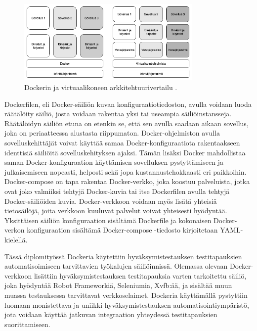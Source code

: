     \begin{figure}[H]
      \centering
      \includegraphics[width=0.8\textwidth]{assets/docker-vs-virtual-machine.png}
      \caption{Dockerin ja virtuaalikoneen arkkitehtuurivertailu \parencite{docker_vs_virtual_machine}.}
      \label{fig:docker-vs-virtual-machine}
    \end{figure}

    Dockerfilen, eli Docker-säiliön kuvan konfiguraatiotiedoston, avulla voidaan luoda räätälöity säiliö, josta voidaan rakentaa yksi tai useampia säiliöinstansseja.
    Räätälöidyn säiliön etuna on etenkin se, että sen avulla saadaan aikaan sovellus, joka on periaatteessa alustasta riippumaton.
    Docker-ohjelmiston avulla sovelluskehittäjät voivat käyttää samaa Docker-konfiguraatiota rakentaakseen identtisiä säiliöitä sovelluskehityksen ajaksi.
    Tämän lisäksi Docker mahdollistaa saman Docker-konfiguraation käyttämisen sovelluksen pystyttämiseen ja julkaisemiseen nopeasti, helposti sekä jopa kustannustehokkaasti eri paikkoihin.
    Docker-compose on tapa rakentaa Docker-verkko, joka koostuu palveluista, jotka ovat joko valmiiksi tehtyjä Docker-kuvia tai itse Dockerfilen avulla tehtyjä Docker-säiliöiden kuvia.
    Docker-verkkoon voidaan myös lisätä yhteisiä tietosäilöjä, joita verkkoon kuuluvat palvelut voivat yhteisesti hyödyntää.
    Yksittäisen säiliön konfiguraation sisältämä Dockerfile ja kokonaisen Docker-verkon konfiguraation sisältämä Docker-compose -tiedosto kirjoitetaan YAML-kielellä.

    Tässä diplomityössä Dockeria käytettiin hyväksymistestauksen testitapauksien automatisoimiseen tarvittavien työkalujen säiliöinnissä.
    Olemassa olevaan Docker-verkkoon lisättiin hyväksymistestauksen testitapauksia varten tarkoitettu säiliö, joka hyödyntää Robot Frameworkiä, Seleniumia, Xvfb:ää, ja sisältää muun muassa testauksessa tarvittavat verkkoselaimet.
    Dockeria käyttämällä pystyttiin luomaan monistettava ja uniikki hyväksymistestauksen automatisointiympäristö, jota voidaan käyttää jatkuvan integraation yhteydessä testitapauksien suorittamiseen.

